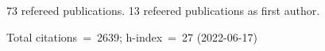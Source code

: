 73 refereed publications. 13 refeered publications as first author.

Total citations~=~2639; h-index~=~27 (2022-06-17)